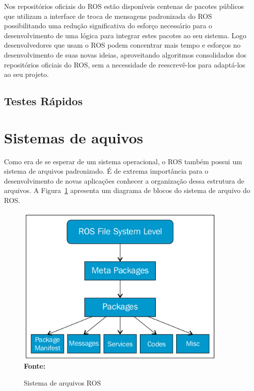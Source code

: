 Nos repositórios oficiais do ROS estão disponíveis centenas de pacotes públicos que utilizam a interface de troca de mensagens padronizada do ROS possibilitando uma redução significativa do esforço necessário para o desenvolvimento de uma lógica para integrar estes pacotes ao seu sistema. Logo desenvolvedores que usam o ROS podem concentrar mais tempo e esforços no desenvolvimento de suas novas ideias, aproveitando algoritmos consolidados dos repositórios oficiais do ROS, sem a necessidade de reescrevê-los para adaptá-los ao seu projeto.


\subsection{Testes Rápidos}


\section{Sistemas de aquivos}
Como era de se esperar de um sistema operacional, o ROS também possui um sistema de arquivos padronizado. É de extrema importância para o desenvolvimento de novas aplicações conhecer a organização dessa estrutura de arquivos. A Figura~\ref{fig:rosfile} apresenta um diagrama de blocos do sistema de arquivo do ROS\@.

\begin{figure}[ht]
	\caption{Sistema de arquivos ROS}
	\begin{center}
		\includegraphics[scale=0.7]{imagens/fileSiystem.png}\\
		{\small \textbf{Fonte:} }
    \end{center}\label{fig:rosfile}
\end{figure}

